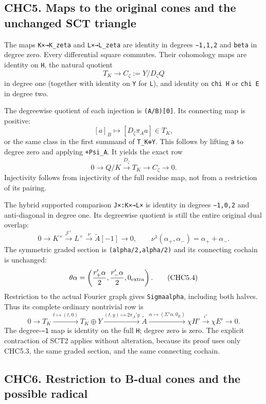 \subsection{CHC5. Maps to the original cones and the unchanged SCT
triangle}\label{chc5.-maps-to-the-original-cones-and-the-unchanged-sct-triangle}

The maps \texttt{K×→K\_zeta} and \texttt{L×→L\_zeta} are identity in
degrees \texttt{−1,1,2} and \texttt{beta} in degree zero. Every
differential square commutes. Their cohomology maps are identity on
\texttt{H}, the natural quotient \[
T_K\longrightarrow C_\zeta:=Y/D_\zeta Q
\] in degree one (together with identity on \texttt{Y} for \texttt{L}),
and identity on \texttt{chi\ H\textquotesingle{}} or
\texttt{chi\ E\textquotesingle{}} in degree two.

The degreewise quotient of each injection is \texttt{(A/B){[}0{]}}. Its
connecting map is positive: \[
[a]_B\longmapsto[D_\zeta\pi_Aa]\in T_K,
\tag{CHC5.1}
\] or the same class in the first summand of \texttt{T\_K⊕Y}. This
follows by lifting \texttt{a} to degree zero and applying
\texttt{+Psi\_A}. It yields the exact row \[
0\to Q/K\xrightarrow{\overline D_\zeta}T_K
\to C_\zeta\to0.
\tag{CHC5.2}
\] Injectivity follows from injectivity of the full residue map, not
from a restriction of its pairing.

The hybrid supported comparison \texttt{J×:K×→L×} is identity in degrees
\texttt{−1,0,2} and anti-diagonal in degree one. Its degreewise quotient
is still the entire original dual overlap: \[
0\to K^\times\xrightarrow{\mathcal J^\times}L^\times
\xrightarrow{\nu}\widetilde A[-1]\to0,
\qquad \nu^1(\alpha_+,\alpha_-)=\alpha_++\alpha_-.
\tag{CHC5.3}
\] The symmetric graded section is \texttt{(alpha/2,alpha/2)} and its
connecting cochain is unchanged: \[
\theta\alpha=
\left(\frac{r_+'\alpha}{2},\frac{r_-'\alpha}{2},0_{\rm extra}\right).
\tag{CHC5.4}
\] Restriction to the actual Fourier graph gives
\texttt{Sigma\textquotesingle{}alpha}, including both halves. Thus its
complete ordinary nontrivial row is \[
0\to T_K\xrightarrow{t\mapsto(t,0)}T_K\oplus Y
\xrightarrow{(t,y)\mapsto2\pi_A'y}\widetilde A
\xrightarrow{\alpha\mapsto(\Sigma'\alpha,0_E)}\chi H'
\xrightarrow{\iota'}\chi E'\to0.
\tag{CHC5.5}
\] The degree-\texttt{−1} map is identity on the full \texttt{H}; degree
zero is zero. The explicit contraction of SCT2 applies without
alteration, because its proof uses only CHC5.3, the same graded section,
and the same connecting cochain.

\subsection{CHC6. Restriction to B-dual cones and the possible
radical}\label{chc6.-restriction-to-b-dual-cones-and-the-possible-radical}

